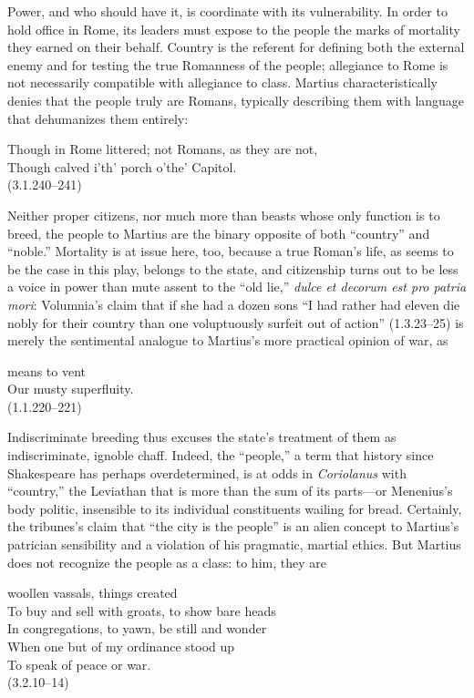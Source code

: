 Power, and who should have it, is coordinate with its vulnerability.
In order to hold office in Rome, its leaders must expose to the people the marks of mortality they earned on their behalf.
Country is the referent for defining both the external enemy and for testing the true Romanness of the people; allegiance to Rome is not necessarily compatible with allegiance to class.
Martius characteristically denies that the people truly are Romans, typically describing them with language that dehumanizes them entirely:
\begin{vq}
Though in Rome littered; not Romans, as they are not,\\
Though calved i'th' porch o'the' Capitol.\\
\hfill(3.1.240--241)
\end{vq}
Neither proper citizens, nor much more than beasts whose only function is to breed, the people to Martius are the binary opposite of both ``country'' and ``noble.''
Mortality is at issue here, too, because a true Roman's life, as seems to be the case in this play, belongs to the state, and citizenship turns out to be less a voice in power than mute assent to the ``old lie,'' \emph{dulce et decorum est pro patria mori}: Volumnia's claim that if she had a dozen sons ``I had rather had eleven die nobly for their country than one voluptuously surfeit out of action'' (1.3.23--25) is merely the sentimental analogue to Martius's more practical opinion of war, as
\begin{vq}
means to vent\\
Our musty superfluity.\\
\hfill(1.1.220--221)
\end{vq}
Indiscriminate breeding thus excuses the state's treatment of them as indiscriminate, ignoble chaff.
Indeed, the ``people,'' a term that history since Shakespeare has perhaps overdetermined, is at odds in \emph{Coriolanus} with ``country,'' the Leviathan that is more than the sum of its parts---or Menenius's body politic, insensible to its individual constituents wailing for bread.
Certainly, the tribunes's claim that ``the city is the people'' is an alien concept to Martius's patrician sensibility and a violation of his pragmatic, martial ethics.
But Martius does not recognize the people as a class: to him, they are
\begin{vq}
woollen vassals, things created\\
To buy and sell with groats, to show bare heads\\
In congregations, to yawn, be still and wonder\\
When one but of my ordinance stood up\\
To speak of peace or war.\\
\hfill(3.2.10--14)
\end{vq}

